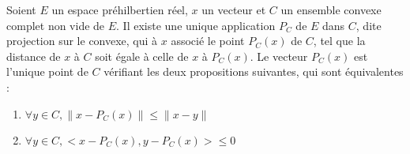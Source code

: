 \documentclass[landscape,twocolumn]{article}
\begin{document}
\begin{ine}
\begin{center}
Soient $E$ un espace préhilbertien réel, $x$ un vecteur et $C$ un ensemble convexe complet non vide de $E$.
Il existe une unique application $P_C$ de $E$ dans $C$, dite projection sur le convexe, qui à $x$ associé le point $P_C(x)$ de $C$, tel que la distance de $x$ à $C$ soit égale à celle de $x$ à $P_C(x)$. Le vecteur $P_C(x)$ est l'unique point de $C$ vérifiant les deux propositions suivantes, qui sont équivalentes : 
\begin{enumerate}
\item $\forall y \in C, \parallel x - P_C(x) \parallel \leq \parallel x - y \parallel$ \\
\item $\forall y \in C, <x-P_C(x), y-P_C(x) > \leq 0$
\end{enumerate}
\end{center}
\end{ine}
\end{document}
